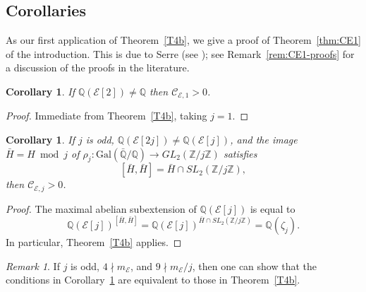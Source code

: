 \documentclass{amsart}
\theoremstyle{plain}
\newtheorem{cor}[theorem]{Corollary}
\theoremstyle{remark}
\newtheorem{remark}[theorem]{Remark}
\newcommand{\Q}{\mathbb{Q}}
\newcommand{\Z}{\mathbb{Z}}
\newcommand{\E}{\mathcal{E}}
\newcommand{\Cc}{\mathcal{C}}
\newcommand{\GalQ}{\mathrm{Gal}(\bar{\Q}/\Q)}
\newcommand{\Gal}{\mathrm{Gal}}
\begin{document}
\subsection{Corollaries}
\label{sec:corollaries}
As our first application of Theorem~\ref{T4b}, we give a proof of 
 Theorem~\ref{thm:CE1} of the introduction. This is due to Serre (see \cite{serreResumeDesCours}); see Remark~\ref{rem:CE1-proofs} for a discussion of the proofs in the literature.
\begin{cor}\label{cor:CE1} If $\Q(\E[2]) \ne \Q$ then $\Cc_{\E,1} > 0$.
\end{cor}
\begin{proof} Immediate from Theorem~\ref{T4b}, taking $j = 1$.
\end{proof}
\begin{cor}\label{cor:j-abelianisation} If $j$ is odd, $\Q(\E[2j]) \ne \Q(\E[j])$, and the image $\bar{H} = H \bmod j$ of $\rho_j : \GalQ \to GL_2(\Z/j\Z)$ satisfies 
\[[\bar{H}, \bar{H}] = \bar{H} \cap SL_2(\Z/j\Z),\]
then $\Cc_{\E,j} > 0$.
\end{cor}
\begin{proof}
    The maximal abelian subextension of $\Q(\E[j])$ is equal to 
    \[\Q(\E[j])^{[\bar{H},\bar{H}]} = \Q(\E[j])^{\bar{H} \cap SL_2(\Z/j\Z)} = \Q(\zeta_j).\]
    In particular, Theorem~\ref{T4b} applies.
\end{proof}
\begin{remark}
    If $j$ is odd, $4 \nmid m_\E$, and $9 \nmid m_\E/j$, then one can show that the conditions in Corollary~\ref{cor:j-abelianisation} are equivalent to those in Theorem~\ref{T4b}.
\end{remark}

\end{document}
